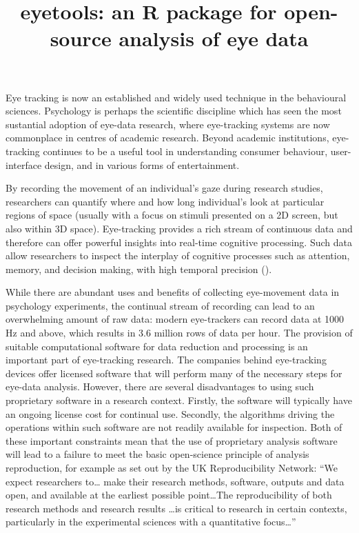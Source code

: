 \documentclass[
  man,
  floatsintext,
  longtable,
  nolmodern,
  notxfonts,
  notimes,
  colorlinks=true,linkcolor=blue,citecolor=blue,urlcolor=blue]{apa7}
\title{eyetools: an R package for open-source analysis of eye data}
\affiliation{
{Lancaster University}}
\begin{document}
\maketitle


\setcounter{secnumdepth}{-\maxdimen} %

\setlength\LTleft{0pt}

\resetlinenumber[1]

Eye tracking is now an established and widely used technique in the
behavioural sciences. Psychology is perhaps the scientific discipline
which has seen the most sustantial adoption of eye-data research, where
eye-tracking systems are now commonplace in centres of academic
research. Beyond academic institutions, eye-tracking continues to be a
useful tool in understanding consumer behaviour, user-interface design,
and in various forms of entertainment.

By recording the movement of an individual's gaze during research
studies, researchers can quantify where and how long individual's look
at particular regions of space (usually with a focus on stimuli
presented on a 2D screen, but also within 3D space). Eye-tracking
provides a rich stream of continuous data and therefore can offer
powerful insights into real-time cognitive processing. Such data allow
researchers to inspect the interplay of cognitive processes such as
attention, memory, and decision making, with high temporal precision
().

While there are abundant uses and benefits of collecting eye-movement
data in psychology experiments, the continual stream of recording can
lead to an overwhelming amount of raw data: modern eye-trackers can
record data at 1000 Hz and above, which results in 3.6 million rows of
data per hour. The provision of suitable computational software for data
reduction and processing is an important part of eye-tracking research.
The companies behind eye-tracking devices offer licensed software that
will perform many of the necessary steps for eye-data analysis. However,
there are several disadvantages to using such proprietary software in a
research context. Firstly, the software will typically have an ongoing
license cost for continual use. Secondly, the algorithms driving the
operations within such software are not readily available for
inspection. Both of these important constraints mean that the use of
proprietary analysis software will lead to a failure to meet the basic
open-science principle of analysis reproduction, for example as set out
by the UK Reproducibility Network: ``We expect researchers to\ldots{}
make their research methods, software, outputs and data open, and
available at the earliest possible point\ldots The reproducibility of
both research methods and research results \ldots is critical to
research in certain contexts, particularly in the experimental sciences
with a quantitative focus\ldots{}''
\end{document}
